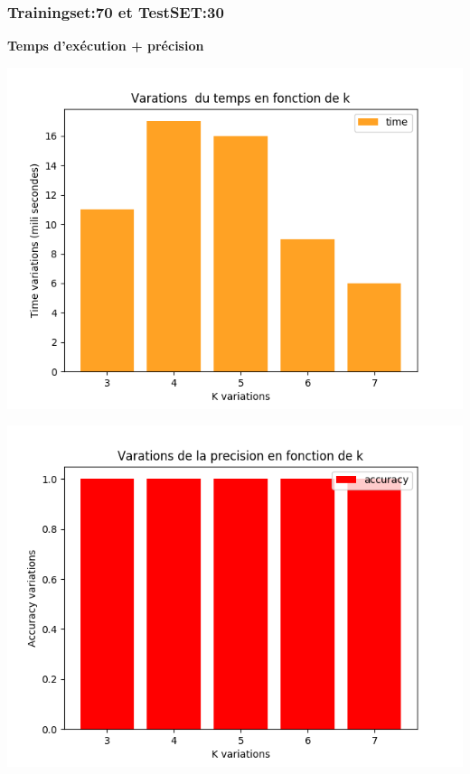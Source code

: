 \documentclass[12pt,a4paper,oneside]{book}
\begin{document}
	
	
	\subsubsection{Trainingset:70 et TestSET:30}
	\textbf{Temps d'exécution + précision}\\
	\begin{frame}{}
		\centering
		\begin{minipage}[b]{0.5\linewidth}
			\includegraphics[scale=0.5]{image/labor:Train,70,Test,30time.png}
			\label{labelname}%
		\end{minipage}
		\hspace{0.5cm}
		\begin{minipage}[b]{0.5\linewidth}
			\includegraphics[scale=0.5]{image/labor:Train,70,Test,30:accuracy.png}%
			\label{labelname}%
		\end{minipage}
	\end{frame}
	
\end{document}
